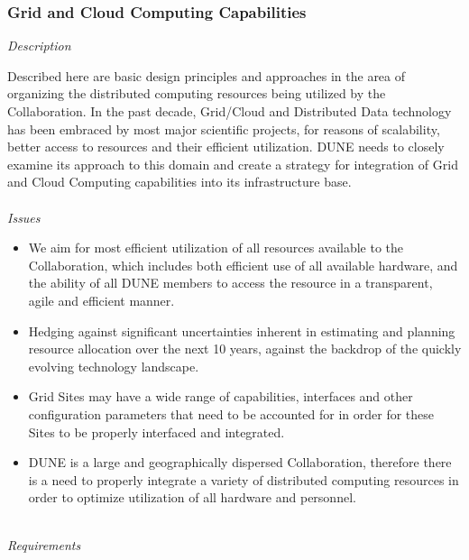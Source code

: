 \subsubsection{Grid and Cloud Computing Capabilities}

\textit{Description}

Described here are basic design principles and approaches in the area of organizing the distributed computing resources being utilized by the Collaboration. In the past decade, Grid/Cloud and Distributed
Data technology has been embraced by most major scientific projects, for reasons of scalability,
better access to resources and their efficient utilization. DUNE needs to closely examine its
approach to this domain and create  a strategy for integration of Grid and Cloud Computing capabilities
into its infrastructure base.
\ 
\\
\ 
\\
\textit{Issues}
\begin{itemize}
	\item We aim for most efficient utilization of all resources available to the Collaboration, which includes both efficient use of all 
	available hardware, and the ability of all DUNE members to access the resource in a transparent, agile and efficient manner.
	
	\item Hedging against significant uncertainties inherent in estimating and planning resource allocation over the next 
	10 years, against the backdrop of the quickly evolving technology landscape.
	
	\item Grid Sites may have a wide range of capabilities, interfaces and other configuration parameters that need to be accounted for in order for these Sites to be properly interfaced and integrated.
	
	\item DUNE is a large and geographically dispersed Collaboration, therefore there is a need to properly integrate a variety of distributed 
	computing resources in order to optimize utilization of all hardware and personnel.
\end{itemize}
\ 
\\
\textit{Requirements}
